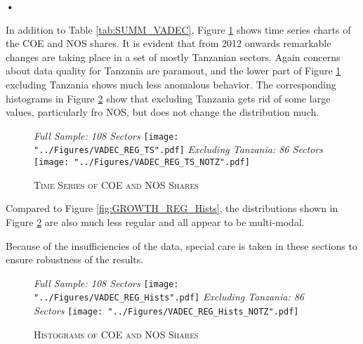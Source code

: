 \textbf{\textbf{•}}\documentclass[a4paper]{article}
\begin{document}
In addition to Table \ref{tab:SUMM_VADEC}, Figure \ref{fig:VADEC_REG_TS} shows time series charts of the COE and NOS shares. It is evident that from 2012 onwards remarkable changes are taking place in a set of mostly Tanzanian sectors. Again concerns about data quality for Tanzania are paramout, and the lower part of Figure \ref{fig:VADEC_REG_TS} excluding Tanzania shows much less anomalous behavior. The corresponding histograms in Figure \ref{fig:VADEC_REG_Hists} show that excluding Tanzania gets rid of some large values, particularly fro NOS, but does not change the distribution much. 

\begin{figure}[h!]
\centering
\caption{\label{fig:VADEC_REG_TS}\textsc{Time Series of COE and NOS Shares}}
\textit{Full Sample: 108 Sectors}
\texttt{[image: "../Figures/VADEC\_REG\_TS".pdf]} %
\textit{Excluding Tanzania: 86 Sectors}
\texttt{[image: "../Figures/VADEC\_REG\_TS\_NOTZ".pdf]} %
\end{figure}
\FloatBarrier

Compared to Figure \ref{fig:GROWTH_REG_Hists}, the distributions shown in Figure \ref{fig:VADEC_REG_Hists} are also much less regular and all appear to be multi-modal. \newline

Because of the insufficiencies of the data, special care is taken in these sections to ensure robustness of the results. 

\begin{figure}[h!]
\centering
\caption{\label{fig:VADEC_REG_Hists}\textsc{Histograms of COE and NOS Shares}}
\textit{Full Sample: 108 Sectors}
\texttt{[image: "../Figures/VADEC\_REG\_Hists".pdf]} %
\textit{Excluding Tanzania: 86 Sectors}
\texttt{[image: "../Figures/VADEC\_REG\_Hists\_NOTZ".pdf]} %
\end{figure}
\FloatBarrier
\end{document}
